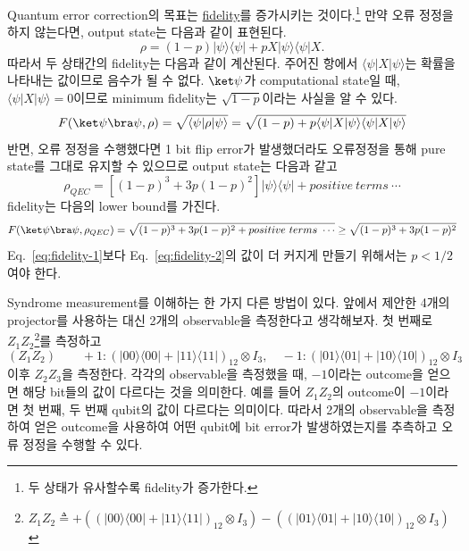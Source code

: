 Quantum error correction의 목표는 \hyperref[sec:quantum-fidelity]{fidelity}를 증가시키는 것이다.\footnote{두 상태가 유사할수록 fidelity가 증가한다.}  만약 오류 정정을 하지 않는다면, output state는 다음과 같이 표현된다.
\begin{equation*}
    \rho=(1-p)|\psi\rangle\langle\psi|+p X|\psi\rangle\langle\psi| X .
\end{equation*}
따라서 두 상태간의 fidelity는 다음과 같이 계산된다. 주어진 항에서 $\langle \psi | X | \psi \rangle$는 확률을 나타내는 값이므로 음수가 될 수 없다. $\ket \psi$가 computational state일 때, $\langle \psi | X | \psi \rangle = 0$이므로 minimum fidelity는 $\sqrt{1-p}$이라는 사실을 알 수 있다.
\begin{equation}
    F(\ket \psi \bra \psi, \rho)=\sqrt{\langle\psi| \rho|\psi\rangle}=\sqrt{(1-p)+p\langle\psi| X|\psi\rangle\langle\psi| X|\psi\rangle} \label{eq:fidelity-1}
\end{equation}
반면, 오류 정정을 수행했다면 1 bit flip error가 발생했더라도 오류정정을 통해 pure state를 그대로 유지할 수 있으므로 output state는 다음과 같고 
\begin{equation*}
    \rho_{QEC}=\left[(1-p)^3+3 p(1-p)^2\right]|\psi\rangle\langle\psi| + positive\ terms\ \cdots
\end{equation*}
fidelity는 다음의 lower bound를 가진다.
\begin{equation}
    F(\ket \psi \bra \psi, \rho_{QEC})  = \sqrt{(1-p)^3+3 p(1-p)^2 + positive\ terms\ \cdots}  \ge \sqrt{(1-p)^3+3 p(1-p)^2} \label{eq:fidelity-2}
\end{equation}
Eq.~\eqref{eq:fidelity-1}보다 Eq.~\eqref{eq:fidelity-2}의 값이 더 커지게 만들기 위해서는 $p < 1/2$여야 한다.

\vspace{1em}

Syndrome measurement를 이해하는 한 가지 다른 방법이 있다. 앞에서 제안한 4개의 projector를 사용하는 대신 2개의 observable을 측정한다고 생각해보자. 첫 번째로 $Z_1Z_2$\footnote{$Z_1Z_2 \triangleq  +\left((|00\rangle\langle 00|+|11\rangle\langle 11|)_{12} \otimes I_3\right) - \left((|01\rangle\langle 01|+|10\rangle\langle 10|)_{12} \otimes I_3 \right)$}를 측정하고
\begin{equation*}
    (Z_1Z_2) \qquad +1:(|00\rangle\langle 00|+|11\rangle\langle 11|)_{12} \otimes I_3, \quad-1:(|01\rangle\langle 01|+|10\rangle\langle 10|)_{12} \otimes I_3
\end{equation*}
이후 $Z_2Z_3$을 측정한다. 각각의 observable을 측정했을 때, $-1$이라는 outcome을 얻으면 해당 bit들의 값이 다르다는 것을 의미한다. 예를 들어 $Z_1Z_2$의 outcome이 $-1$이라면 첫 번째, 두 번째 qubit의 값이 다르다는 의미이다.
따라서 2개의 observable을 측정하여 얻은 outcome을 사용하여 어떤 qubit에 bit error가 발생하였는지를 추측하고 오류 정정을 수행할 수 있다. 



